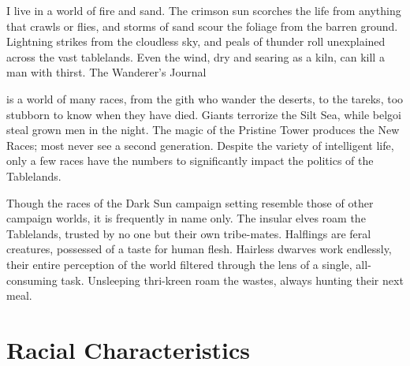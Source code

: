 {I live in a world of fire and sand. The crimson sun scorches the life from anything that crawls or flies, and storms of sand scour the foliage from the barren ground. Lightning strikes from the cloudless sky, and peals of thunder roll unexplained across the vast tablelands. Even the wind, dry and searing as a kiln, can kill a man with thirst.}
{The Wanderer's Journal}

 is a world of many races, from the gith who wander the deserts, to the tareks, too stubborn to know when they have died. Giants terrorize the Silt Sea, while belgoi steal grown men in the night. The magic of the Pristine Tower produces the New Races; most never see a second generation. Despite the variety of intelligent life, only a few races have the numbers to significantly impact the politics of the Tablelands.

Though the races of the {\tableheader Dark Sun} campaign setting resemble those of other campaign worlds, it is frequently in name only. The insular elves roam the Tablelands, trusted by no one but their own tribe-mates. Halflings are feral creatures, possessed of a taste for human flesh. Hairless dwarves work endlessly, their entire perception of the world filtered through the lens of a single, all-consuming task. Unsleeping thri-kreen roam the wastes, always hunting their next meal.

\section{Racial Characteristics}

